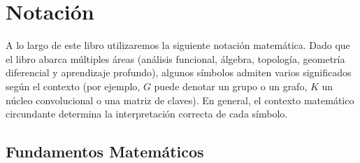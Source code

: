 \chapter*{Notación}

A lo largo de este libro utilizaremos la siguiente notación matemática.
Dado que el libro abarca múltiples áreas (análisis funcional, álgebra,
topología, geometría diferencial y aprendizaje profundo), algunos símbolos
admiten varios significados según el contexto (por ejemplo, $G$ puede denotar
un grupo o un grafo, $K$ un núcleo convolucional o una matriz de claves).
En general, el contexto matemático circundante determina la
interpretación correcta de cada símbolo.

\section*{Fundamentos Matemáticos}

